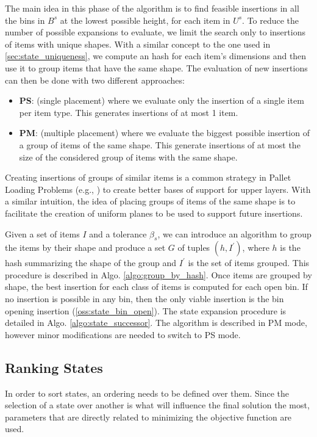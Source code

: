 The main idea in this phase of the algorithm is to find feasible insertions in all the bins in $B^s$ at the lowest possible height, for each item in $U^s$. 
To reduce the number of possible expansions to evaluate, we limit the search only to insertions of items with unique shapes.
With a similar concept to the one used in \cref{sec:state_uniqueness}, we compute an hash for each item's dimensions and then use it to group items that have the same shape.
The evaluation of new insertions can then be done with two different approaches:
\begin{itemize}
    \label{def:placement_modes}%
    \item \textbf{PS}: (single placement) where we evaluate only the insertion of a single item per item type. This generates insertions of at most 1 item.
    \item \textbf{PM}: (multiple placement) where we evaluate the biggest possible insertion of a group of items of the same shape. This generate insertions of at most the size of the considered group of items with the same shape.
\end{itemize}
Creating insertions of groups of similar items is a common strategy in Pallet Loading Problems (e.g., \cite{elhedhli2019three}) to create better bases of support for upper layers.
With a similar intuition, the idea of placing groups of items of the same shape is to facilitate the creation of uniform planes to be used to support future insertions.

Given a set of items $I$ and a tolerance $\beta_s$, we can introduce an algorithm to group the items by their shape and produce a set $G$ of tuples $(h, I^\prime)$, where $h$ is the hash summarizing the shape of the group and $I^\prime$ is the set of items grouped. This procedure is described in Algo. \ref{algo:group_by_hash}.
Once items are grouped by shape, the best insertion for each class of items is computed for each open bin. If no insertion is possible in any bin, then the only viable insertion is the bin opening insertion (\cref{oss:state_bin_open}).
The state expansion procedure is detailed in Algo. \ref{algo:state_successor}. The algorithm is described in PM mode, however minor modifications are needed to switch to PS mode.





\subsection{Ranking States}
\label{ssec:scoring_states}%
In order to sort states, an ordering needs to be defined over them.
Since the selection of a state over another is what will influence the final solution the most, parameters that are directly related to minimizing the objective function are used.

